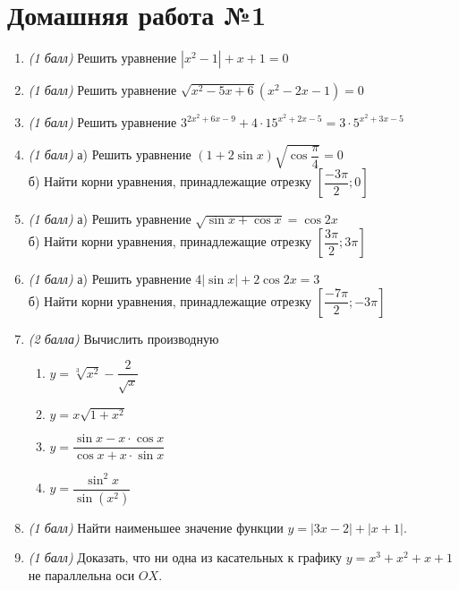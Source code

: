 \documentclass[12pt, a4paper]{article}
\begin{document}
	

\section*{Домашняя работа №1}
\begin{enumerate}
	\item \textit{(1 балл)} Решить уравнение $|x^2-1|+x+1=0$
	\item \textit{(1 балл)} Решить уравнение $\sqrt{x^2-5x+6}(x^2-2x-1)=0$
	\item \textit{(1 балл)} Решить уравнение $3^{2x^2+6x-9}+4\cdot15^{x^2+2x-5}=3\cdot5^{x^2+3x-5}$
	\item \textit{(1 балл)} а) Решить уравнение $(1+2\sin x)\sqrt{\cos{\dfrac{\pi}{4}}}=0$ \\
	б) Найти корни уравнения, принадлежащие отрезку $\left[\dfrac{-3\pi}{2};0\right]$
	\item \textit{(1 балл)} а) Решить уравнение $\sqrt{\sin x + \cos x}=\cos 2x$ \\
	б) Найти корни уравнения, принадлежащие отрезку $\left[\dfrac{3\pi}{2};3\pi\right]$
	\item \textit{(1 балл)} а) Решить уравнение $4|\sin x|+2\cos 2x=3$ \\
	б) Найти корни уравнения, принадлежащие отрезку $\left[\dfrac{-7\pi}{2};-3\pi\right]$
	\item \textit{(2 балла)} Вычислить производную
	\begin{multicols}{2}
		\begin{enumerate}[label=\asbuk*)]
			\item $y=\sqrt[3]{x^2}-\dfrac{2}{\sqrt{x}}$
			\item $y=x\sqrt{1+x^2}$
			\item $y=\dfrac{\sin x - x\cdot\cos x}{\cos x + x\cdot\sin x}$
			\item $y=\dfrac{\sin^2 x}{\sin (x^2)}$
		\end{enumerate}
	\end{multicols}
	\item \textit{(1 балл)} Найти наименьшее значение функции $y=|3x-2|+|x+1|$.
	\item \textit{(1 балл)} Доказать, что ни одна из касательных к графику $y=x^3+x^2+x+1$ не параллельна оси $OX$.
\end{enumerate}
\end{document}
